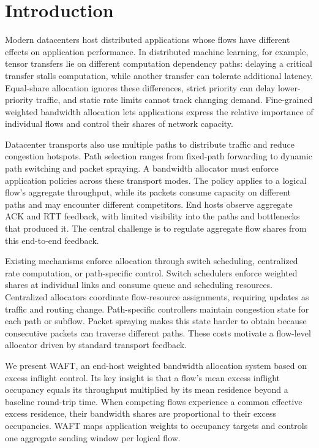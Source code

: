 \section{Introduction}
\label{sec:introduction}

Modern datacenters host distributed applications whose flows have different effects on application performance. In distributed machine learning, for example, tensor transfers lie on different computation dependency paths: delaying a critical transfer stalls computation, while another transfer can tolerate additional latency. Equal-share allocation ignores these differences, strict priority can delay lower-priority traffic, and static rate limits cannot track changing demand. Fine-grained weighted bandwidth allocation lets applications express the relative importance of individual flows and control their shares of network capacity.

Datacenter transports also use multiple paths to distribute traffic and reduce congestion hotspots. Path selection ranges from fixed-path forwarding to dynamic path switching and packet spraying. A bandwidth allocator must enforce application policies across these transport modes. The policy applies to a logical flow's aggregate throughput, while its packets consume capacity on different paths and may encounter different competitors. End hosts observe aggregate ACK and RTT feedback, with limited visibility into the paths and bottlenecks that produced it. The central challenge is to regulate aggregate flow shares from this end-to-end feedback.

Existing mechanisms enforce allocation through switch scheduling, centralized rate computation, or path-specific control. Switch schedulers enforce weighted shares at individual links and consume queue and scheduling resources. Centralized allocators coordinate flow-resource assignments, requiring updates as traffic and routing change. Path-specific controllers maintain congestion state for each path or subflow. Packet spraying makes this state harder to obtain because consecutive packets can traverse different paths. These costs motivate a flow-level allocator driven by standard transport feedback.

We present WAFT, an end-host weighted bandwidth allocation system based on excess inflight control. Its key insight is that a flow's mean excess inflight occupancy equals its throughput multiplied by its mean residence beyond a baseline round-trip time. When competing flows experience a common effective excess residence, their bandwidth shares are proportional to their excess occupancies. WAFT maps application weights to occupancy targets and controls one aggregate sending window per logical flow.

